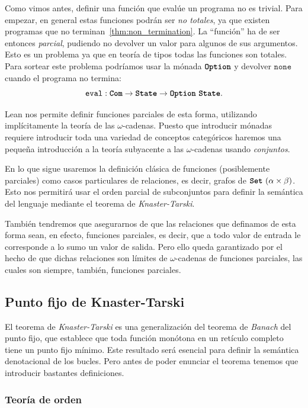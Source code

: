 \documentclass[
  a4paper, 
  10pt, 
  parskip=half, 
  toc=bibliography,
]{scrbook}
\theoremstyle{definition}
\theoremstyle{bolddef}
\newcommand{\funfont}[1]{\texttt{#1}}
\newcommand{\tyfont}[1]{\texttt{\textbf{#1}}}
\begin{document}
Como vimos antes, definir una función que evalúe un programa no es trivial.
Para empezar, en general estas funciones podrán ser \emph{no totales}, ya que existen programas que no
terminan~\ref{thm:non_termination}. La \enquote{función} ha de ser entonces
\emph{parcial}, pudiendo no devolver un valor para algunos de sus argumentos.
Esto es un problema ya que en teoría de tipos todas las funciones son
totales. Para sortear este problema
podríamos usar la mónada \(\tyfont{Option}\) y devolver \(\funfont{none}\) cuando el
programa no termina:
\[
  \funfont{eval} : \tyfont{Com} \to \tyfont{State} \to \tyfont{Option} \ \tyfont{State}.
\]

Lean nos permite definir funciones parciales de esta forma, utilizando implícitamente
la teoría de las \(\omega\)-cadenas. Puesto que introducir mónadas requiere 
introducir toda una variedad de conceptos categóricos haremos una pequeña
introducción a la teoría subyacente a las \(\omega\)-cadenas usando
\emph{conjuntos}.

En lo que sigue usaremos la definición clásica de funciones (posiblemente parciales) 
como casos particulares de relaciones, es decir, 
grafos de \(\tyfont{Set} \ (\alpha \times \beta)\). Esto nos permitirá usar el
orden parcial de subconjuntos para definir la semántica del lenguaje
mediante el teorema de \emph{Knaster-Tarski}. 

También tendremos que asegurarnos de que las relaciones que definamos de esta forma
sean, en efecto, funciones parciales, es decir, que a todo valor de entrada le corresponde
a lo sumo un valor de salida. Pero ello queda garantizado por el hecho de que
dichas relaciones son límites de \(\omega\)-cadenas de funciones parciales,
las cuales son siempre, también, funciones parciales.

\subsection{Punto fijo de Knaster-Tarski}

El teorema de \emph{Knaster-Tarski} es una generalización del teorema de
\emph{Banach} del punto fijo, que establece que toda función monótona
en un retículo completo tiene un punto fijo mínimo. Este resultado será esencial 
para definir la semántica denotacional de los bucles. Pero antes de poder
enunciar el teorema tenemos que introducir bastantes definiciones.

\subsubsection{Teoría de orden}
\end{document}
